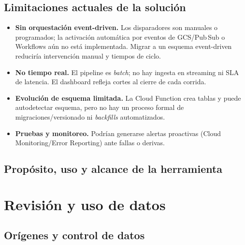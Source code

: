 \documentclass[10pt]{article}
\begin{document}
\subsection{Limitaciones actuales de la solución}
\label{subsec:limitaciones-solucion}

\begin{itemize}
  \item \textbf{Sin orquestación event-driven.} Los disparadores son manuales o programados; la activación automática por eventos de GCS/Pub\,\/Sub o Workflows aún no está implementada. Migrar a un esquema event-driven reduciría intervención manual y tiempos de ciclo.
  \item \textbf{No tiempo real.} El pipeline es \textit{batch}; no hay ingesta en streaming ni SLA de latencia. El dashboard refleja cortes al cierre de cada corrida.
  \item \textbf{Evolución de esquema limitada.} La Cloud Function crea tablas y puede autodetectar esquema, pero no hay un proceso formal de migraciones/versionado ni \textit{backfills} automatizados.
  \item \textbf{Pruebas y monitoreo.} Podrían generarse alertas proactivas (Cloud Monitoring/Error Reporting) ante fallas o derivas.
\end{itemize}

\subsection{Propósito, uso y alcance de la herramienta} %
\section{Revisión y uso de datos}
\subsection{Orígenes y control de datos} %
\end{document}
